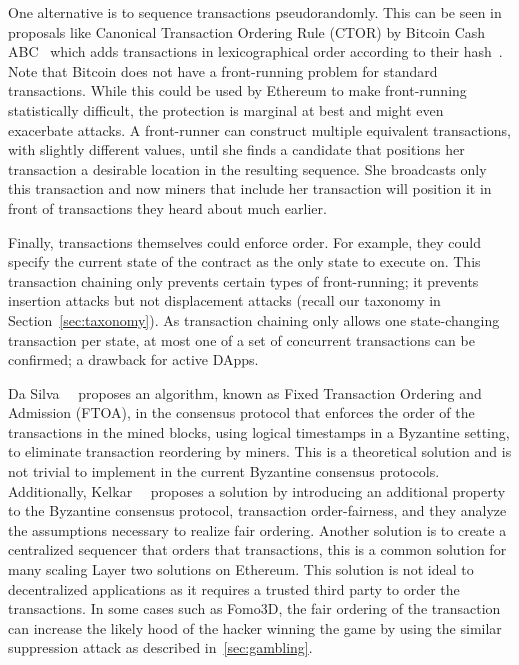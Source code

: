 One alternative is to sequence transactions pseudorandomly. This can be seen in proposals like Canonical Transaction Ordering Rule (CTOR) by Bitcoin Cash ABC~\cite{bitcoincashabcFork} which adds transactions in lexicographical order according to their hash~\cite{bitcoinABC2018CTOR}. Note that Bitcoin does not have a front-running problem for standard transactions. While this could be used by Ethereum to make front-running statistically difficult, the protection is marginal at best and might even exacerbate attacks. A front-runner can construct multiple equivalent transactions, with slightly different values, until she finds a candidate that positions her transaction a desirable location in the resulting sequence. She broadcasts only this transaction and now miners that include her transaction will position it in front of transactions they heard about much earlier.


Finally, transactions themselves could enforce order. For example, they could specify the current state of the contract as the only state to execute on. This transaction chaining only prevents certain types of front-running; \ie it prevents insertion attacks but not displacement attacks (recall our taxonomy in Section~\ref{sec:taxonomy}). As transaction chaining only allows one state-changing transaction per state, at most one of a set of concurrent transactions can be confirmed; a drawback for active DApps.

Da Silva~\etal~\cite{da2019fixed} proposes an algorithm, known as Fixed Transaction Ordering and Admission (FTOA), in the consensus protocol that enforces the order of the transactions in the mined blocks, using logical timestamps in a Byzantine setting, to eliminate transaction reordering by miners. This is a theoretical solution and is not trivial to implement in the current Byzantine consensus protocols. Additionally, Kelkar~\etal~\cite{kelkar2020order} proposes a solution by introducing an additional property to the Byzantine consensus protocol, transaction order-fairness, and they analyze the assumptions necessary to realize fair ordering. Another solution is to create a centralized sequencer that orders that transactions, this is a common solution for many scaling Layer two solutions on Ethereum. This solution is not ideal to decentralized applications as it requires a trusted third party to order the transactions. In some cases such as Fomo3D, the fair ordering of the transaction can increase the likely hood of the hacker winning the game by using the similar suppression attack as described in~\ref{sec:gambling}. 

